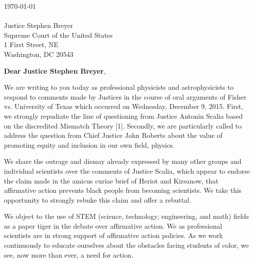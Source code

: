 \documentclass[letterpaper,11pt]{letter}
\begin{document}
\pagestyle{plain}

\newcommand \justice {Justice Stephen Breyer}


\today \\ \\
\justice \\
Supreme Court of the United States \\
1 First Street, NE \\
Washington, DC 20543

{\bf Dear \justice},

We are writing to you today as professional physicists and astrophysicists to respond to comments made by Justices in the course of oral arguments of Fisher vs. University of Texas which occurred on Wednesday, December 9, 2015. First, we strongly repudiate the line of questioning from Justice Antonin Scalia based on the discredited Mismatch Theory [1]. Secondly, we are particularly called to address the question from Chief Justice John Roberts about the value of promoting equity and inclusion in our own field, physics. 

We share the outrage and dismay already expressed by many other groups and individual scientists over the comments of Justice Scalia, which appear to endorse the claim made in the amicus curiae brief of Heriot and Kirsanow, that affirmative action prevents black people from becoming scientists. We take this opportunity to strongly rebuke this claim and offer a rebuttal.

We object to the use of STEM (science, technology, engineering, and math) fields as a paper tiger in the debate over affirmative action. We as professional scientists are in strong support of affirmative action policies. As we work continuously to educate ourselves about the obstacles facing students of color, we see, now more than ever, a need for action.
\end{document}
